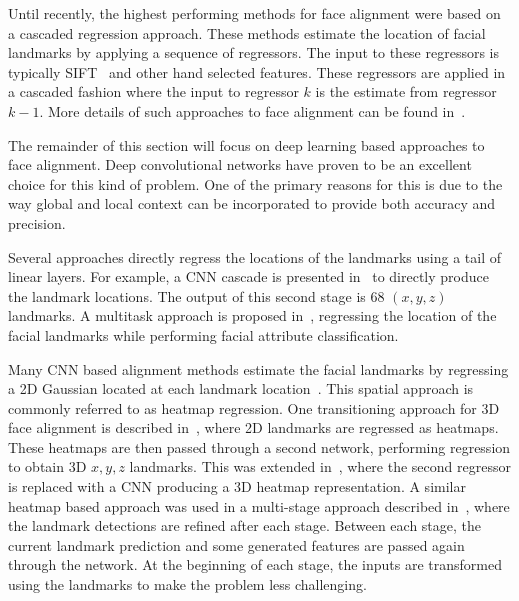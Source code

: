 
Until recently, the highest performing methods for face alignment were
based on a cascaded regression approach. These methods estimate the
location of facial landmarks by applying a sequence of regressors. The
input to these regressors is typically SIFT~\cite{lowe2004distinctive}
and other hand selected features. These regressors are applied in a
cascaded fashion where the input to regressor $k$ is the estimate from
regressor $k-1$. More details of such approaches to face alignment can
be found
in~\cite{dollar2010cascaded,sanchez16,cao2014facewarehouse,xiongsupervised,zhu2015face,tzimiropoulos2015project}.

The remainder of this section will focus on deep learning based
approaches to face alignment. Deep convolutional networks have proven
to be an excellent choice for this kind of problem. One of the primary
reasons for this is due to the way global and local context can be
incorporated to provide both accuracy and precision.


Several approaches directly regress the locations of the landmarks
using a tail of linear layers. For example, a CNN cascade is presented
in~\cite{sun2013deep} to directly produce the landmark locations. The
output of this second stage is 68 $(x, y, z)$ landmarks. A multitask
approach is proposed in~\cite{zhang2014facial}, regressing the
location of the facial landmarks while performing facial attribute
classification.

Many CNN based alignment methods estimate the facial landmarks by
regressing a 2D Gaussian located at each landmark
location~\cite{bulat2016two,bulat2017far,mahpod2018facial,kowalski2017deep,merget2018robust}.
This spatial approach is commonly referred to as heatmap
regression. One transitioning approach for 3D face alignment is
described in~\cite{bulat2016two}, where 2D landmarks are regressed as
heatmaps. These heatmaps are then passed through a second network,
performing regression to obtain 3D $x,y,z$ landmarks. This was
extended in~\cite{bulat2017far}, where the second regressor is
replaced with a CNN producing a 3D heatmap representation. A similar
heatmap based approach was used in a multi-stage approach described
in~\cite{kowalski2017deep}, where the landmark detections are refined
after each stage. Between each stage, the current landmark prediction
and some generated features are passed again through the network. At
the beginning of each stage, the inputs are transformed using the
landmarks to make the problem less challenging.

